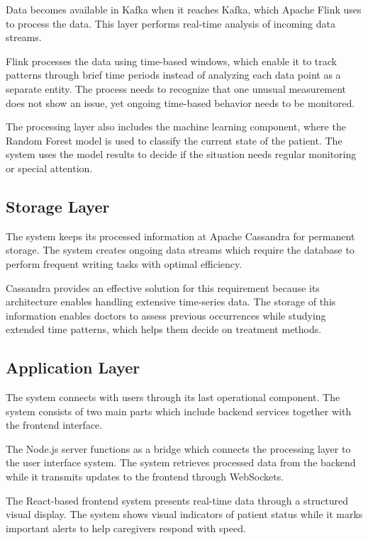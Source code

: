\documentclass[12pt, a4paper, oneside]{report}
\begin{document}
Data becomes available in Kafka when it reaches Kafka, which Apache Flink uses to process the data. This layer performs real-time analysis of incoming data streams.

Flink processes the data using time-based windows, which enable it to track patterns through brief time periods instead of analyzing each data point as a separate entity. The process needs to recognize that one unusual measurement does not show an issue, yet ongoing time-based behavior needs to be monitored.

The processing layer also includes the machine learning component, where the Random Forest model is used to classify the current state of the patient. The system uses the model results to decide if the situation needs regular monitoring or special attention.

\subsection{Storage Layer}

The system keeps its processed information at Apache Cassandra for permanent storage. The system creates ongoing data streams which require the database to perform frequent writing tasks with optimal efficiency.

Cassandra provides an effective solution for this requirement because its architecture enables handling extensive time-series data. The storage of this information enables doctors to assess previous occurrences while studying extended time patterns, which helps them decide on treatment methods.

\subsection{Application Layer}

The system connects with users through its last operational component. The system consists of two main parts which include backend services together with the frontend interface.

The Node.js server functions as a bridge which connects the processing layer to the user interface system. The system retrieves processed data from the backend while it transmits updates to the frontend through WebSockets.

The React-based frontend system presents real-time data through a structured visual display. The system shows visual indicators of patient status while it marks important alerts to help caregivers respond with speed.
\end{document}

